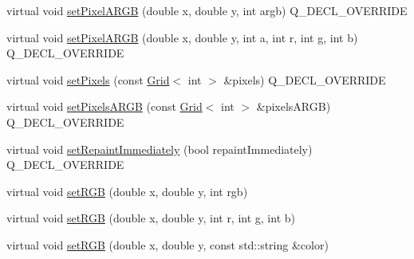 \begin{DoxyCompactItemize}
\item 
virtual void \mbox{\hyperlink{classGForwardDrawingSurface_a366f5f71f21ad732fd2e2fdf624f0953}{set\+Pixel\+A\+R\+GB}} (double x, double y, int argb) Q\+\_\+\+D\+E\+C\+L\+\_\+\+O\+V\+E\+R\+R\+I\+DE
\item 
virtual void \mbox{\hyperlink{classGForwardDrawingSurface_a3de28156839da845f8d24503c9a3b111}{set\+Pixel\+A\+R\+GB}} (double x, double y, int a, int r, int g, int b) Q\+\_\+\+D\+E\+C\+L\+\_\+\+O\+V\+E\+R\+R\+I\+DE
\item 
virtual void \mbox{\hyperlink{classGForwardDrawingSurface_a83fcae972f2677bf1ece054930f53162}{set\+Pixels}} (const \mbox{\hyperlink{classGrid}{Grid}}$<$ int $>$ \&pixels) Q\+\_\+\+D\+E\+C\+L\+\_\+\+O\+V\+E\+R\+R\+I\+DE
\item 
virtual void \mbox{\hyperlink{classGForwardDrawingSurface_a64dd4bc93e7f6555e9d96b956602c7c8}{set\+Pixels\+A\+R\+GB}} (const \mbox{\hyperlink{classGrid}{Grid}}$<$ int $>$ \&pixels\+A\+R\+GB) Q\+\_\+\+D\+E\+C\+L\+\_\+\+O\+V\+E\+R\+R\+I\+DE
\item 
virtual void \mbox{\hyperlink{classGForwardDrawingSurface_aeff32a9d798f45677e84060eb9de68e9}{set\+Repaint\+Immediately}} (bool repaint\+Immediately) Q\+\_\+\+D\+E\+C\+L\+\_\+\+O\+V\+E\+R\+R\+I\+DE
\item 
virtual void \mbox{\hyperlink{classGDrawingSurface_a8bcbd65fa784bdab1e66a9efd381162d}{set\+R\+GB}} (double x, double y, int rgb)
\item 
virtual void \mbox{\hyperlink{classGDrawingSurface_a81202471d4fc9f2015aef0bc073acfab}{set\+R\+GB}} (double x, double y, int r, int g, int b)
\item 
virtual void \mbox{\hyperlink{classGDrawingSurface_ae9a228792d4bb4b628350f39eaa3ad12}{set\+R\+GB}} (double x, double y, const std\+::string \&color)
\end{DoxyCompactItemize}
